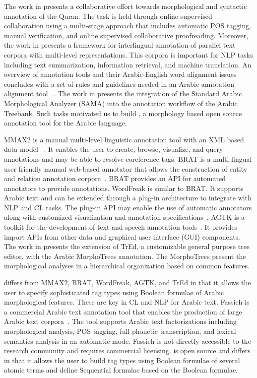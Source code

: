 The work in \cite{dukes2011supervised} presents a collaborative effort towards morphological 
and syntactic annotation of the Quran. 
The task is held through online supervised collaboration using a multi-stage approach that 
includes automatic POS tagging, manual verification, and online supervised collaborative 
proofreading. 
Moreover, the work in \cite{dorr2010interlingual} presents a framework for interlingual 
annotation of parallel text corpora with multi-level representations. 
This corpora is important for NLP tasks including text summarization, information retrieval, 
and machine translation.
An overview of annotation tools and their Arabic-English word alignment issues 
concludes with a set of rules and guidelines needed in an Arabic annotation alignment tool
~\cite{kholidy2010towards}.
The work in \cite{kulick2010consistent} presents the integration of the Standard Arabic Morphological 
Analyzer (SAMA) into the annotation workflow of the Arabic Treebank.
Such tasks motivated us to build \framework, a morphology based open source annotation tool 
for the Arabic language.

MMAX2 is a manual multi-level linguistic annotation tool with an XML 
based data model ~\cite{mmax2}. 
It enables the user to create, browse, visualize, and query annotations
and may be able to resolve coreference tags. 
BRAT is a multi-lingual user friendly manual web-based annotator that allows the construction 
of entity and relation annotation corpora~\cite{brat}. 
BRAT provides an API for automated annotators to provide annotations.
WordFreak is similar to BRAT. It supports Arabic text and can be extended through a plug-in 
architecture to integrate with NLP and CL tasks. 
The plug-in API may enable the use of automatic annotators along with customized visualization 
and annotation specifications~\cite{wordfreak}. 
AGTK is a toolkit for the development of text and speech annotation tools~\cite{agtk}. 
It provides import APIs from other data and graphical user interface (GUI) components. 
The work in \cite{smrz2004morphotrees} presents the extension of TrEd, a customizable 
general purpose tree editor, with the Arabic MorphoTrees annotation. The MorphoTrees present 
the morphological analyses in a hierarchical organization based on common features.

\framework differs from MMAX2, BRAT, WordFreak, AGTK, and TrEd in that it allows the user to specify 
sophisticated tag types using Boolean formulae of Arabic morphological features. 
These are key in CL and NLP for Arabic text. 
Fassieh is a commercial Arabic text annotation tool that enables the production of large 
Arabic text corpora~\cite{attia2009fassieh}. 
The tool supports Arabic text factorizations including morphological analysis, POS tagging, 
full phonetic transcription, and lexical semantics analysis in an automatic mode. 
Fassieh is not directly accessible to the research community and requires commercial licensing. 
\framework is open source and differs in that it allows the user to build tag types 
using Boolean formulae of several atomic terms and define Sequential formulae based on the Boolean formulae. 

